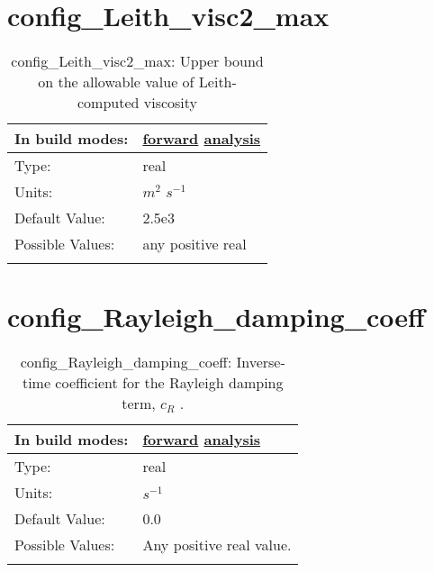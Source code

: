 \section[config\_Leith\_visc2\_max]{config\_Leith\_visc2\_max}
\label{sec:nm_sec_config_Leith_visc2_max}
\begin{center}
\begin{longtable}{| p{2.0in} || p{4.0in} |}
    \hline
    In build modes: & \hyperref[subsec:forward_nm_tab_hmix_Leith]{forward} \hyperref[subsec:analysis_nm_tab_hmix_Leith]{analysis} \\
    \hline
    Type: & real \\
    \hline
    Units: & $m^2$ $s^{-1}$ \\
    \hline
    Default Value: & 2.5e3 \\
    \hline
    Possible Values: & any positive real \\
    \hline
    \caption{config\_Leith\_visc2\_max: Upper bound on the allowable value of Leith-computed viscosity}
\end{longtable}
\end{center}
\section[config\_Rayleigh\_damping\_coeff]{config\_Rayleigh\_damping\_coeff}
\label{sec:nm_sec_config_Rayleigh_damping_coeff}
\begin{center}
\begin{longtable}{| p{2.0in} || p{4.0in} |}
    \hline
    In build modes: & \hyperref[subsec:forward_nm_tab_Rayleigh_damping]{forward} \hyperref[subsec:analysis_nm_tab_Rayleigh_damping]{analysis} \\
    \hline
    Type: & real \\
    \hline
    Units: & $s^{-1}$ \\
    \hline
    Default Value: & 0.0 \\
    \hline
    Possible Values: & Any positive real value. \\
    \hline
    \caption{config\_Rayleigh\_damping\_coeff:  Inverse-time coefficient for the Rayleigh damping term,  $c_R$ .}
\end{longtable}
\end{center}

